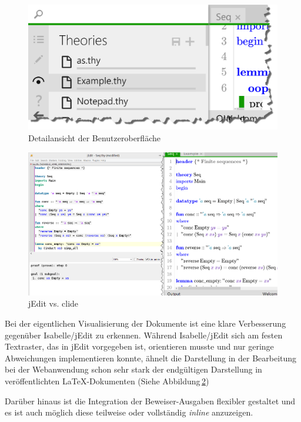 \begin{figure}[ht]
\includegraphics[width=\linewidth]{images/screen-detail}
  \caption{Detailansicht der Benutzeroberfläche}
  \label{fig:screen-detail}
\end{figure}

\begin{figure}[ht]
\includegraphics[width=\linewidth]{images/jedit}
  \caption{jEdit vs. clide}
  \label{fig:jedit}
\end{figure}

Bei der eigentlichen Visualisierung der Dokumente ist eine klare Verbesserung gegenüber
Isabelle/jEdit zu erkennen. Während Isabelle/jEdit sich am festen Textraster, das in jEdit
vorgegeben ist, orientieren musste und nur geringe Abweichungen implementieren konnte, ähnelt die
Darstellung in der Bearbeitung bei der Webanwendung schon sehr stark der endgültigen Darstellung in
veröffentlichten \LaTeX-Dokumenten (Siehe Abbildung\,\ref{fig:jedit})

Darüber hinaus ist die Integration der Beweiser-Ausgaben flexibler gestaltet und es ist auch möglich
diese teilweise oder vollständig \textit{inline} anzuzeigen.

